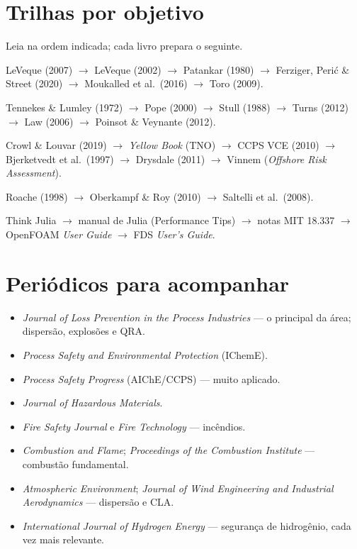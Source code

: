 \documentclass[10pt,a4paper,twocolumn,openany]{report}
\begin{document}
\section*{Trilhas por objetivo}
Leia na ordem indicada; cada livro prepara o seguinte.
\begin{description}[leftmargin=0pt]
  \item[Dominar a numérica.] LeVeque (2007) $\rightarrow$ LeVeque (2002)
        $\rightarrow$ Patankar (1980) $\rightarrow$ Ferziger, Perić \&
        Street (2020) $\rightarrow$ Moukalled et al.\ (2016) $\rightarrow$
        Toro (2009).
  \item[Entender a física.] Tennekes \& Lumley (1972) $\rightarrow$ Pope
        (2000) $\rightarrow$ Stull (1988) $\rightarrow$ Turns (2012)
        $\rightarrow$ Law (2006) $\rightarrow$ Poinsot \& Veynante (2012).
  \item[Segurança aplicada.] Crowl \& Louvar (2019) $\rightarrow$
        \emph{Yellow Book} (TNO) $\rightarrow$ CCPS VCE (2010) $\rightarrow$
        Bjerketvedt et al.\ (1997) $\rightarrow$ Drysdale (2011)
        $\rightarrow$ Vinnem (\emph{Offshore Risk Assessment}).
  \item[Credibilidade.] Roache (1998) $\rightarrow$ Oberkampf \& Roy (2010)
        $\rightarrow$ Saltelli et al.\ (2008).
  \item[Ferramentas.] Think Julia $\rightarrow$ manual de Julia (Performance
        Tips) $\rightarrow$ notas MIT 18.337 $\rightarrow$ OpenFOAM
        \emph{User Guide} $\rightarrow$ FDS \emph{User's Guide}.
\end{description}

\section*{Periódicos para acompanhar}
\begin{itemize}
  \item \emph{Journal of Loss Prevention in the Process Industries} --- o
        principal da área; dispersão, explosões e QRA.
  \item \emph{Process Safety and Environmental Protection} (IChemE).
  \item \emph{Process Safety Progress} (AIChE/CCPS) --- muito aplicado.
  \item \emph{Journal of Hazardous Materials}.
  \item \emph{Fire Safety Journal} e \emph{Fire Technology} --- incêndios.
  \item \emph{Combustion and Flame}; \emph{Proceedings of the Combustion
        Institute} --- combustão fundamental.
  \item \emph{Atmospheric Environment}; \emph{Journal of Wind Engineering
        and Industrial Aerodynamics} --- dispersão e CLA.
  \item \emph{International Journal of Hydrogen Energy} --- segurança de
        hidrogênio, cada vez mais relevante.
\end{itemize}
\end{document}
